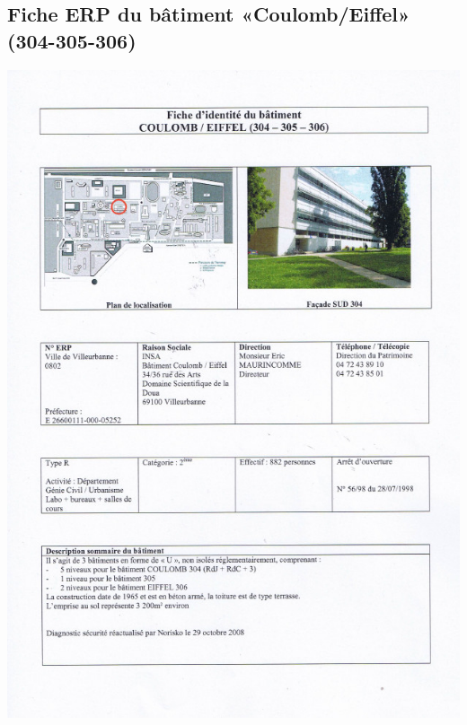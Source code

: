 \documentclass[hidelinks, paper=a4, fontsize=13pt]{report}
\begin{document}
\subsection{Fiche ERP du bâtiment «Coulomb/Eiffel» (304-305-306)}
\begin{center}
\includegraphics[scale=0.65]{Annexes/Documents/ERPCoulomb}
\end{center}
\end{document}
